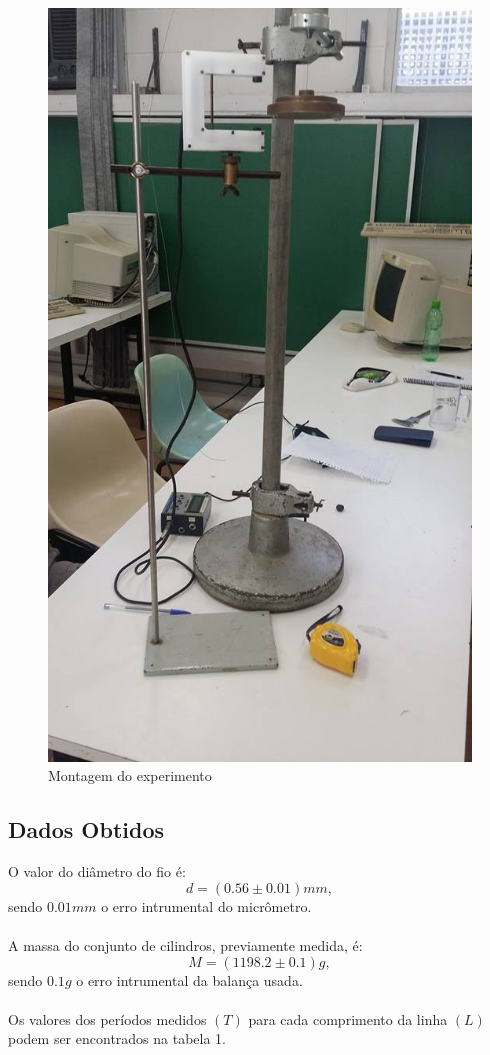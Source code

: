 \documentclass[12pt,a4paper]{article}
\begin{document}
\begin{figure}[!htbp]
	\includegraphics[scale=0.30]{02.jpg}
	\caption{Montagem do experimento}
\end{figure}

\subsection{Dados Obtidos}
O valor do diâmetro do fio é:
$$ d = (0.56 \pm 0.01) mm, $$
sendo $0.01 mm$ o erro intrumental do micrômetro.\\\\
A massa do conjunto de cilindros, previamente medida, é:
$$ M = (1198.2 \pm 0.1) g,$$
sendo $0.1 g$ o erro intrumental da balança usada.\\\\
Os valores dos períodos medidos $(T)$ para cada comprimento da linha $(L)$ podem ser encontrados na tabela 1.
\end{document}
